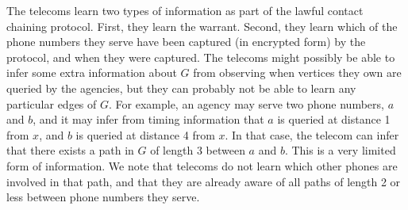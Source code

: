 The telecoms learn two types of information as part of the lawful contact chaining protocol. First, they learn the warrant. Second, they learn which of the phone numbers they serve have been captured (in encrypted form) by the protocol, and when they were captured. The telecoms might possibly be able to infer some extra information about $G$ from observing when vertices they own are queried by the agencies, but they can probably not be able to learn any particular edges of $G$. For example, an agency may serve two phone numbers, $a$ and $b$, and it may infer from timing information that $a$ is queried at distance 1 from $x$, and $b$ is queried at distance 4 from $x$. In that case, the telecom can infer that there exists a path in $G$ of length 3 between $a$ and $b$. This is a very limited form of information. We note that telecoms do not learn which other phones are involved in that path, and that they are already aware of all paths of length 2 or less between phone numbers they serve.